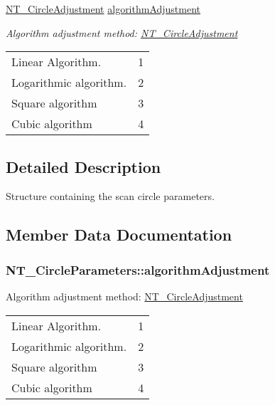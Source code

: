 \begin{DoxyCompactItemize}
\hyperlink{group___common_ga3283dfae2d4aebfb73f1d3db07a36860}{N\+T\+\_\+\+Circle\+Adjustment} \hyperlink{struct_n_t___circle_parameters_a55ad72ec6eba3db04199555f7bacf1b5}{algorithm\+Adjustment}
\begin{DoxyCompactList}\small\item\em Algorithm adjustment method\+: \hyperlink{group___common_ga3283dfae2d4aebfb73f1d3db07a36860}{N\+T\+\_\+\+Circle\+Adjustment} \tabulinesep=1mm
\begin{longtabu} spread 0pt [c]{*2{|X[-1]}|}
\hline
Linear Algorithm.&1 \\
Logarithmic algorithm.&2 \\
Square algorithm&3 \\
Cubic algorithm&4 \\
\end{longtabu}
\end{DoxyCompactList}\end{DoxyCompactItemize}


\subsection{Detailed Description}
Structure containing the scan circle parameters. 



\subsection{Member Data Documentation}
\subsubsection[{\texorpdfstring{algorithm\+Adjustment}{algorithmAdjustment}}]{ N\+T\+\_\+\+Circle\+Parameters\+::algorithm\+Adjustment}\hypertarget{struct_n_t___circle_parameters_a55ad72ec6eba3db04199555f7bacf1b5}{}\label{struct_n_t___circle_parameters_a55ad72ec6eba3db04199555f7bacf1b5}


Algorithm adjustment method\+: \hyperlink{group___common_ga3283dfae2d4aebfb73f1d3db07a36860}{N\+T\+\_\+\+Circle\+Adjustment} \tabulinesep=1mm
\begin{longtabu} spread 0pt [c]{*2{|X[-1]}|}
\hline
Linear Algorithm.&1 \\
Logarithmic algorithm.&2 \\
Square algorithm&3 \\
Cubic algorithm&4 \\
\end{longtabu}


